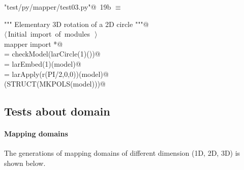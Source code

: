 \documentclass[11pt,oneside]{article}	%
\begin{document}
\begin{flushleft} \small \label{scrap36}
\protect{}\verb@"test/py/mapper/test03.py"@\nobreak\ {\footnotesize 19b }$\equiv$
\vspace{-1ex}
\begin{list}{}{} \item
\mbox{}\verb@""" Elementary 3D rotation of a 2D circle """@\\
\mbox{}\verb@@\hbox{$\langle\,$Initial import of modules\nobreak\ {\footnotesize {}}$\,\rangle$}\verb@@\\
\mbox{}\verb@from mapper import *@\\
\mbox{}\verb@model = checkModel(larCircle(1)())@\\
\mbox{}\verb@model = larEmbed(1)(model)@\\
\mbox{}\verb@model = larApply(r(PI/2,0,0))(model)@\\
\mbox{}\verb@VIEW(STRUCT(MKPOLS(model)))@\\
\mbox{}\verb@@{\NWsep}
\end{list}
\vspace{-2ex}
\end{flushleft}




\subsection{Tests about domain}

\paragraph{Mapping domains}
The generations of mapping domains of different dimension (1D, 2D, 3D) is shown below.
	
\end{document}
